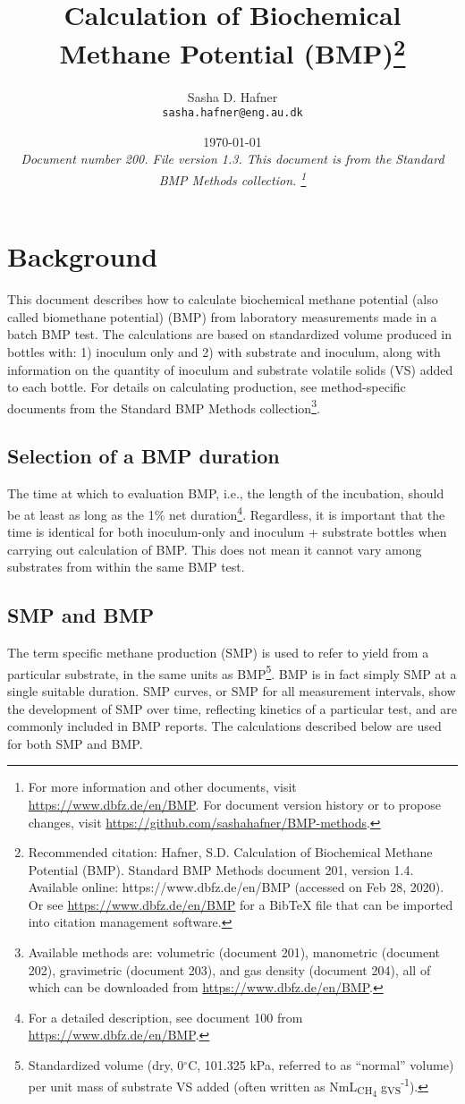 \documentclass[]{article}
\title {Calculation of Biochemical Methane Potential (BMP)\footnote{
  Recommended citation: 
Hafner, S.D. Calculation of Biochemical Methane Potential (BMP). Standard BMP Methods document 201, version 1.4. Available online: https://www.dbfz.de/en/BMP (accessed on Feb 28, 2020).
\newline
  Or see \url{https://www.dbfz.de/en/BMP} for a BibTeX file that can be imported into citation management software.
}}
\author{Sasha D. Hafner\\
\texttt{sasha.hafner@eng.au.dk}
}
\date{\today \\
\bigskip
\textit{
  Document number 200.
  File version 1.3. 
  This document is from the Standard BMP Methods collection.
    \footnote{For more information and other documents, visit \url{https://www.dbfz.de/en/BMP}. 
    For document version history or to propose changes, visit \url{https://github.com/sashahafner/BMP-methods}.}
}
}
\begin{document}
\maketitle

\section{Background}
This document describes how to calculate biochemical methane potential (also called biomethane potential) (BMP) from laboratory measurements made in a batch BMP test.
The calculations are based on standardized  volume produced in bottles with: 1) inoculum only and 2) with substrate and inoculum, along with information on the quantity of inoculum and substrate volatile solids (VS) added to each bottle.
For details on calculating  production, see method-specific documents from the Standard BMP Methods collection\footnote{
  Available methods are: volumetric (document 201), manometric (document 202), gravimetric (document 203), and gas density (document 204), all of which can be downloaded from \url{https://www.dbfz.de/en/BMP}.
}.

\subsection{Selection of a BMP duration}
The time at which to evaluation BMP, i.e., the length of the incubation, should be at least as long as the 1\% net duration\footnote{
  For a detailed description, see document 100 from \url{https://www.dbfz.de/en/BMP}.
}.
Regardless, it is important that the time is identical for both inoculum-only and inoculum + substrate bottles when carrying out calculation of BMP.
This does not mean it cannot vary among substrates from within the same BMP test.

\subsection{SMP and BMP}
The term specific methane production (SMP) is used to refer to  yield from a particular substrate, in the same units as BMP\footnote{
Standardized  volume (dry, 0$^\circ$C, 101.325 kPa, referred to as ``normal'' volume) per unit mass of substrate VS added (often written as NmL\textsubscript{CH\textsubscript{4}} g\textsubscript{VS}\textsuperscript{-1}).
}.
BMP is in fact simply SMP at a single suitable duration.
SMP curves, or SMP for all measurement intervals, show the development of SMP over time, reflecting kinetics of a particular test, and are commonly included in BMP reports.
The calculations described below are used for both SMP and BMP.
\end{document}
